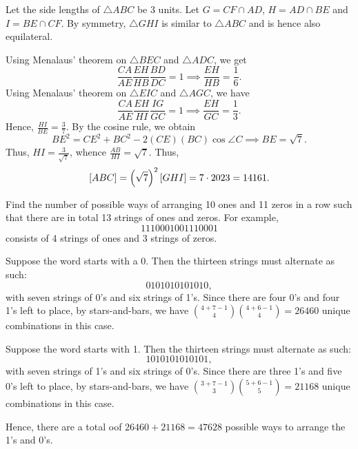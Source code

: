 \begin{solution*}
    Let the side lengths of $\triangle ABC$ be 3 units. Let $G = CF \cap AD$, $H = AD \cap BE$ and $I = BE \cap CF$. By symmetry, $\triangle GHI$ is similar to $\triangle ABC$ and is hence also equilateral.
    
    Using Menalaus' theorem on $\triangle BEC$ and $\triangle ADC$, we get \[\frac{CA}{AE} \frac{EH}{HB} \frac{BD}{DC} = 1 \implies \frac{EH}{HB} = \frac16.\] Using Menalaus' theorem on $\triangle EIC$ and $\triangle AGC$, we have \[\frac{CA}{AE} \frac{EH}{HI} \frac{IG}{GC} = 1 \implies \frac{EH}{GC} = \frac13.\] Hence, $\frac{HI}{BE} = \frac37$. By the cosine rule, we obtain \[BE^2 = CE^2 + BC^2 - 2(CE)(BC)\cos \angle C \implies BE = \sqrt{7}.\] Thus, $HI = \frac3{\sqrt7}$, whence $\frac{AB}{HI} = \sqrt7$. Thus, \[[ABC] = \left( \sqrt7 \right)^2 [GHI] = 7 \cdot 2023 = 14161.\]
\end{solution*}

\begin{question}[47628]\label{Q::2023-S-1-22}
    Find the number of possible ways of arranging 10 ones and 11 zeros in a row such that there are in total 13 strings of ones and zeros. For example, \[1110001001110001\] consists of 4 strings of ones and 3 strings of zeros.
\end{question}
\begin{solution*}
     Suppose the word starts with a 0. Then the thirteen strings must alternate as such: \[0101010101010,\] with seven strings of 0's and six strings of 1's. Since there are four 0's and four 1's left to place, by stars-and-bars, we have $\binom{4 + 7 - 1}{4} \binom{4 + 6 - 1}{4} = 26460$ unique combinations in this case.

     Suppose the word starts with 1. Then the thirteen strings must alternate as such: \[1010101010101,\] with seven strings of 1's and six strings of 0's. Since there are three 1's and five 0's left to place, by stars-and-bars, we have $\binom{3 + 7 - 1}{3} \binom{5 + 6 - 1}{5} = 21168$ unique combinations in this case.

    Hence, there are a total oof $26460 + 21168 = 47628$ possible ways to arrange the 1's and 0's.
\end{solution*}

